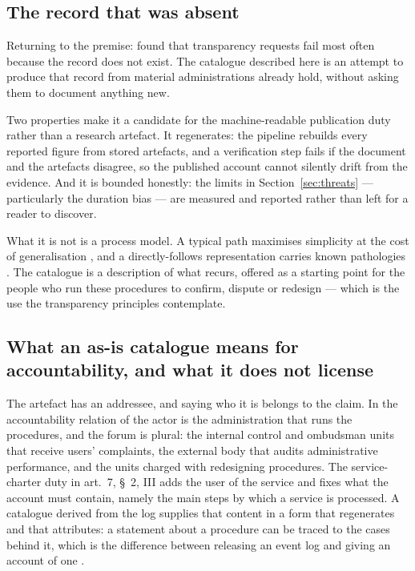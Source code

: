 \subsection{The record that was absent}

Returning to the premise: \citet{brauneis2018algorithmic} found that transparency requests fail
most often because the record does not exist. The catalogue described here is an attempt to
produce that record from material administrations already hold, without asking them to document
anything new.

Two properties make it a candidate for the machine-readable publication duty rather than a
research artefact. It regenerates: the pipeline rebuilds every reported figure from stored
artefacts, and a verification step fails if the document and the artefacts disagree, so the
published account cannot silently drift from the evidence. And it is bounded honestly: the
limits in Section~\ref{sec:threats} --- particularly the duration bias --- are measured and
reported rather than left for a reader to discover.

What it is not is a process model. A typical path maximises simplicity at the cost of
generalisation \citep{buijs2014quality}, and a directly-follows representation carries known
pathologies \citep{vanderaalst2019dfg}. The catalogue is a description of what recurs, offered
as a starting point for the people who run these procedures to confirm, dispute or redesign ---
which is the use the transparency principles contemplate.

\subsection{What an as-is catalogue means for accountability, and what it does not license}

The artefact has an addressee, and saying who it is belongs to the claim. In the accountability
relation of \citet{bovens2007analysing} the actor is the administration that runs the
procedures, and the forum is plural: the internal control and ombudsman units that receive
users' complaints, the external body that audits administrative performance, and the units
charged with redesigning procedures. The service-charter duty in art.~7, \S~2, III
\citep{brasil2017cdu} adds the user of the service and fixes what the account must contain,
namely the main steps by which a service is processed. A catalogue derived from the log supplies
that content in a form that regenerates and that attributes: a statement about a procedure can
be traced to the cases behind it, which is the difference between releasing an event log and
giving an account of one \citep{ananny2018seeing, janssen2012benefits}.

